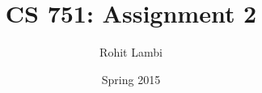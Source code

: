 \documentclass[letterpaper]{report}
\begin{document}
\renewcommand{\thesection}{\arabic{section}}


\newcommand{\hmwkTitle}{Assignment\ \2}
\newcommand{\assignmentDescription}{}
\newcommand{\hmwkDueDate}{Thursday,\ March\ 05,\ 2015} 
\newcommand{\hmwkClass}{CS\ 751} 
\newcommand{\hmwkAuthorName}{Rohit Lambi <rlambi>}


\author{Rohit Lambi}
\title{CS 751: Assignment 2 \\
\normalsize\vspace{0.1in}\large{\assignmentDescription}
}

\date{Spring 2015}

\maketitle

\tableofcontents
\newpage








\nocite{*}
\end{document}
